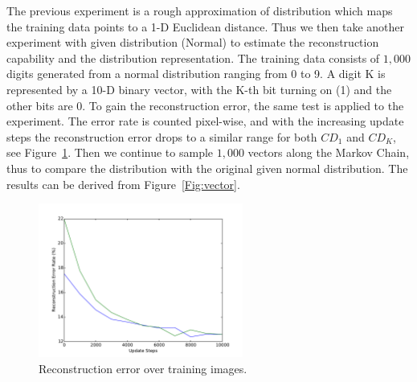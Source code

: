 The previous experiment is a rough approximation of distribution which maps the training data points to a 1-D Euclidean distance.
Thus we then take another experiment with given distribution (Normal) to estimate the reconstruction capability and the distribution representation.
The training data consists of $1,000$ digits generated from a normal distribution ranging from 0 to 9.
A digit K is represented by a 10-D binary vector, with the K-th bit turning on (1) and the other bits are 0.
To gain the reconstruction error, the same test is applied to the experiment.
The error rate is counted pixel-wise, and with the increasing update steps the reconstruction error drops to a similar range for both $CD_1$ and $CD_K$, see Figure~\ref{Fig:disRecon}.
Then we continue to sample $1,000$ vectors along the Markov Chain, thus to compare the distribution with the original given normal distribution.
The results can be derived from Figure~\ref{Fig:vector}.
\begin{figure}[hbt]
				\centering
				\includegraphics[width=0.6\textwidth]{pics_sdbn/ReconError.pdf}
				\caption{Reconstruction error over training images. } 
				\label{Fig:disRecon}
\end{figure}

